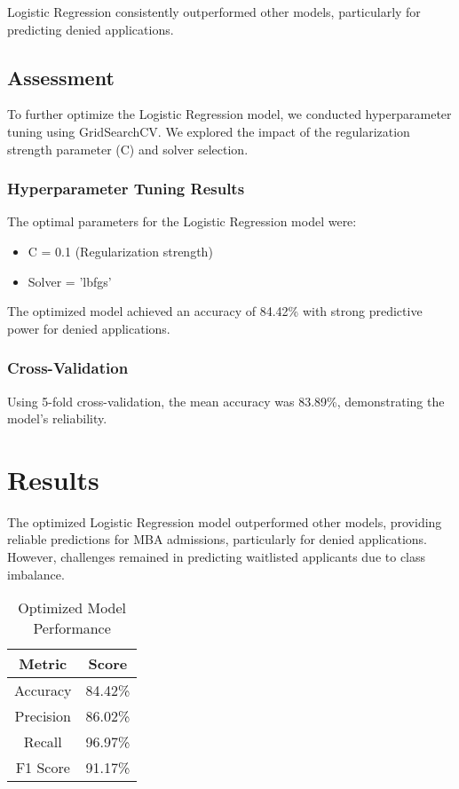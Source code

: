 \documentclass{article}
\begin{document}
Logistic Regression consistently outperformed other models, particularly for predicting denied applications.

\subsection{Assessment}

To further optimize the Logistic Regression model, we conducted hyperparameter tuning using GridSearchCV. We explored the impact of the regularization strength parameter (C) and solver selection.

\subsubsection{Hyperparameter Tuning Results}
The optimal parameters for the Logistic Regression model were:
\begin{itemize}
    \item C = 0.1 (Regularization strength)
    \item Solver = 'lbfgs'
\end{itemize}

The optimized model achieved an accuracy of 84.42\% with strong predictive power for denied applications.

\subsubsection{Cross-Validation}
Using 5-fold cross-validation, the mean accuracy was 83.89\%, demonstrating the model's reliability.

\section{Results}

The optimized Logistic Regression model outperformed other models, providing reliable predictions for MBA admissions, particularly for denied applications. However, challenges remained in predicting waitlisted applicants due to class imbalance.

\begin{table}[h]
\centering
\begin{tabular}{|c|c|}
\hline
Metric     & Score    \\
\hline
Accuracy   & 84.42\%  \\
Precision  & 86.02\%  \\
Recall     & 96.97\%  \\
F1 Score   & 91.17\%  \\
\hline
\end{tabular}
\caption{Optimized Model Performance}
\end{table}
\end{document}
